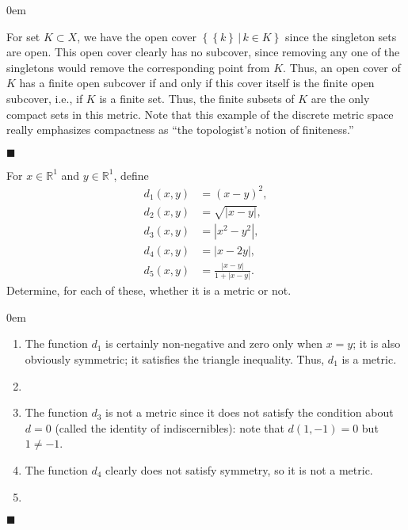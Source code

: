 \documentclass[12pt]{article}
\renewcommand{\qed}{\hfill$\blacksquare$}
\renewenvironment{proof}{\begin{addmargin}[1em]{0em}\begin{newproof}}{\end{newproof}\end{addmargin}\qed}
\newenvironment{problem}[2][Exercise]{\begin{trivlist}
\item[\hskip \labelsep {\bfseries #1}\hskip \labelsep {\bfseries #2.}]}{\end{trivlist}}
\begin{document}
\begin{proof}
For set $K \subset X$, we have the open cover $\left\{ \left\{k\right\}\, | \, k \in K\right\}$ since the singleton sets are open. This open cover clearly has {\color{red}no subcover}, since removing any one of the singletons would remove the corresponding point from $K$. Thus, an open cover of $K$ has a finite open subcover if and only if this cover itself is the finite open subcover, i.e., if $K$ is a finite set. Thus, the finite subsets of $K$ are the only compact sets in this metric. {\color{red}Note that this example of the discrete metric space really emphasizes compactness as ``the topologist's notion of finiteness.''}
\end{proof}



\begin{problem}{2.11}
For $x\in \mathbb{R}^1$ and $y\in \mathbb{R}^1$, define \begin{align*}
d_1\left(x,y\right) & = \left(x-y\right)^2, \\
d_2\left(x,y\right) & = \sqrt{\left|x-y\right|}, \\
d_3\left(x,y\right) & = \left|x^2-y^2\right|, \\
d_4\left(x,y\right) & = \left|x-2y\right|,\\
d_5\left(x,y\right) & = \frac{\left|x-y\right|}{1+\left|x-y\right|}.
\end{align*} Determine, for each of these, whether it is a metric or not.
\end{problem}
\begin{proof}
\begin{enumerate}
	\item The function $d_1$ is certainly non-negative and zero only when $x=y$; it is also obviously symmetric; it satisfies the triangle inequality. Thus, $d_1$ is a metric.
	\item 
	\item The function $d_3$ is not a metric since it does not satisfy the condition about $d=0$ (called the identity of indiscernibles): note that $d\left(1,-1\right)=0$ but $ 1 \neq -1$.
	\item The function $d_4$ clearly does not satisfy symmetry, so it is not a metric.
	\item 
\end{enumerate}
\end{proof}
\end{document}
